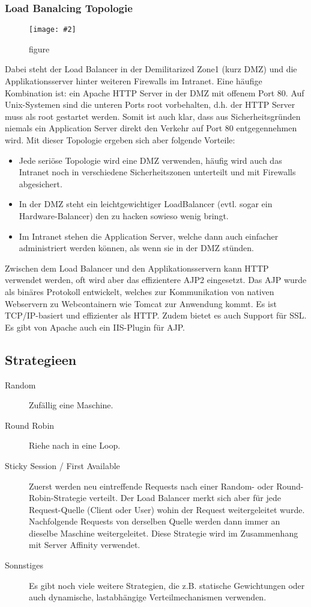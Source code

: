 \documentclass[a4paper,10pt]{scrreprt}
\newcommand{\pic}[2][figure]{\begin{figure}[h]
 \centering
 \texttt{[image: \#2]}
 \caption{#1}
\end{figure}
}
\begin{document}
\subsubsection{Load Banalcing Topologie} %
\label{ssub:load_banalcing_topologie}
\pic{lbt.png}
Dabei steht der Load Balancer in der Demilitarized Zone1 (kurz DMZ) und die Applikationsserver hinter weiteren
Firewalls im Intranet. Eine häufige Kombination ist: ein Apache HTTP Server in der DMZ mit offenem Port 80.
Auf Unix-Systemen sind die unteren Ports root vorbehalten, d.h. der HTTP Server muss als root gestartet
werden. Somit ist auch klar, dass aus Sicherheitsgründen niemals ein Application Server direkt den Verkehr auf
Port 80 entgegennehmen wird. Mit dieser Topologie ergeben sich aber folgende Vorteile:
\begin{itemize}

\item  Jede seriöse Topologie wird eine DMZ verwenden, häufig wird auch das Intranet noch in verschiedene
Sicherheitszonen unterteilt und mit Firewalls abgesichert.
\item In der DMZ steht ein leichtgewichtiger LoadBalancer (evtl. sogar ein Hardware-Balancer) den zu hacken
sowieso wenig bringt.
\item  Im Intranet stehen die Application Server, welche dann auch einfacher administriert werden können, als
wenn sie in der DMZ stünden.
\end{itemize}
Zwischen dem Load Balancer und den Applikationsservern kann HTTP verwendet werden, oft wird aber das
effizientere AJP2 eingesetzt. Das AJP wurde als binäres Protokoll entwickelt, welches zur Kommunikation von
nativen Webservern zu Webcontainern wie Tomcat zur Anwendung kommt. Es ist TCP/IP-basiert und effizienter
als HTTP. Zudem bietet es auch Support für SSL. Es gibt von Apache auch ein IIS-Plugin für AJP.

\subsection{Strategieen} %
\label{sub:strategieen}

\begin{description}
	\item[Random] Zufällig eine Maschine.
	\item[Round Robin] Riehe nach in eine Loop.
	\item [Sticky Session / First Available] Zuerst werden neu eintreffende Requests nach einer Random- oder
Round-Robin-Strategie verteilt. Der Load Balancer merkt sich aber für jede Request-Quelle (Client oder
User) wohin der Request weitergeleitet wurde. Nachfolgende Requests von derselben Quelle werden dann
immer an dieselbe Maschine weitergeleitet. Diese Strategie wird im Zusammenhang mit Server Affinity
verwendet.
\item[Sonnstiges] Es gibt noch viele weitere Strategien, die z.B. statische Gewichtungen oder auch dynamische, lastabhängige
Verteilmechanismen verwenden.
\end{description}
\end{document}
